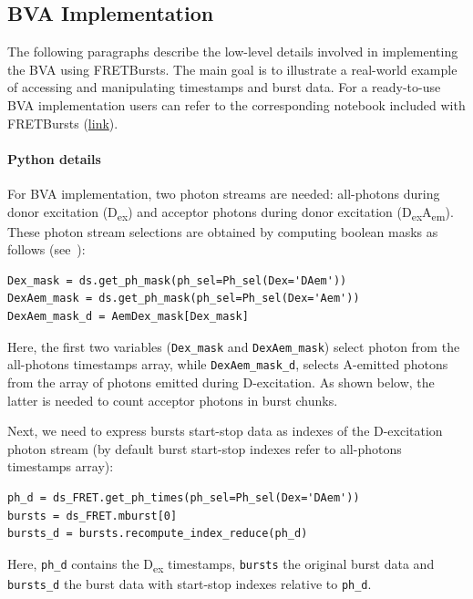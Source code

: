 \documentclass[10pt,letterpaper]{article}
\begin{document}
\subsection*{BVA Implementation}

The following paragraphs describe the low-level details involved in implementing the BVA using FRETBursts.
The main goal is to illustrate a real-world example of accessing and manipulating timestamps and burst data.
For a ready-to-use BVA implementation users can refer to the corresponding notebook included with FRETBursts
(\href{http://nbviewer.jupyter.org/github/tritemio/FRETBursts_notebooks/blob/master/notebooks/Example%20-%20Burst%20Variance%20Analysis.ipynb}{link}).

\paragraph*{Python details}
For BVA implementation, two photon streams are needed: all-photons during donor excitation (D\textsubscript{ex})
and acceptor photons during donor excitation (D\textsubscript{ex}A\textsubscript{em}).
These photon stream selections are obtained by computing boolean masks as follows
(see~):

\begin{lstlisting}
Dex_mask = ds.get_ph_mask(ph_sel=Ph_sel(Dex='DAem'))
DexAem_mask = ds.get_ph_mask(ph_sel=Ph_sel(Dex='Aem'))
DexAem_mask_d = AemDex_mask[Dex_mask]
\end{lstlisting}

Here, the first two variables (\verb|Dex_mask| and \verb|DexAem_mask|)
select photon from the all-photons timestamps array,
while \verb|DexAem_mask_d|, selects A-emitted photons from the
array of photons emitted during D-excitation. As shown below,
the latter is needed to count acceptor photons in burst chunks.

Next, we need to express bursts start-stop data as indexes of the D-excitation photon stream
(by default burst start-stop indexes refer to all-photons timestamps array):

\begin{lstlisting}
ph_d = ds_FRET.get_ph_times(ph_sel=Ph_sel(Dex='DAem'))
bursts = ds_FRET.mburst[0]
bursts_d = bursts.recompute_index_reduce(ph_d)
\end{lstlisting}

Here, \verb|ph_d| contains the D\textsubscript{ex} timestamps, \verb|bursts| the original burst data and
\verb|bursts_d| the burst data with start-stop indexes relative to \verb|ph_d|.
\end{document}
